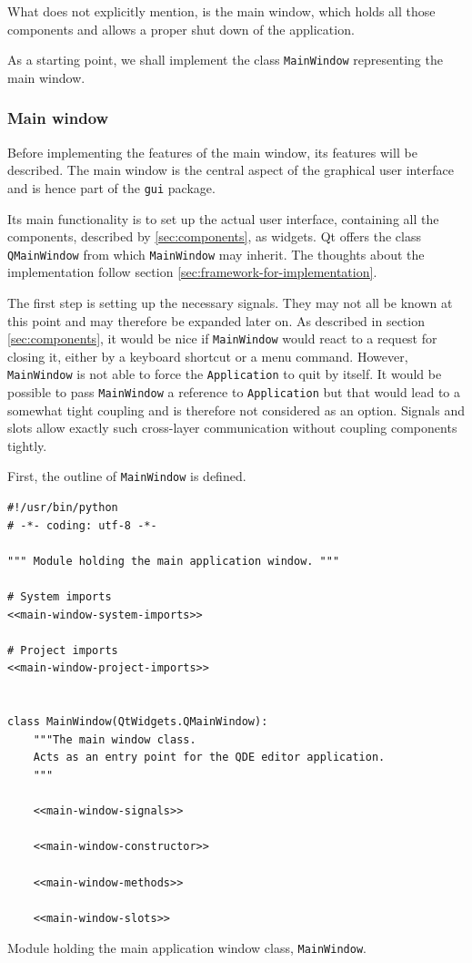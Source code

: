 \documentclass[10pt, openright, notitlepage]{scrreprt}
\begin{document}
What \cite{osterwalder_qde_2016} does not explicitly mention, is the main
window, which holds all those components and allows a proper shut down of the
application.

As a starting point, we shall implement the class \texttt{MainWindow} representing the
main window.

\subsubsection{Main window}
\label{sec:org1632560}

Before implementing the features of the main window, its features will be
described. The main window is the central aspect of the graphical user interface
and is hence part of the \texttt{gui} package.

Its main functionality is to set up the actual user interface, containing all
the components, described by \ref{sec:components}, as widgets. Qt offers the class
\texttt{QMainWindow} from which \texttt{MainWindow} may inherit. The thoughts about the
implementation follow section \ref{sec:framework-for-implementation}.

The first step is setting up the necessary signals. They may not all be known at
this point and may therefore be expanded later on. As described in section
\ref{sec:components}, it would be nice if \texttt{MainWindow} would react to a request for
closing it, either by a keyboard shortcut or a menu command. However,
\texttt{MainWindow} is not able to force the \texttt{Application} to quit by itself. It would
be possible to pass \texttt{MainWindow} a reference to \texttt{Application} but that would
lead to a somewhat tight coupling and is therefore not considered as an option.
Signals and slots allow exactly such cross-layer communication without coupling
components tightly.

First, the outline of \texttt{MainWindow} is defined.

\begin{listing}[H]
\begin{verbatim}
#!/usr/bin/python
# -*- coding: utf-8 -*-

""" Module holding the main application window. """

# System imports
<<main-window-system-imports>>

# Project imports
<<main-window-project-imports>>


class MainWindow(QtWidgets.QMainWindow):
    """The main window class.
    Acts as an entry point for the QDE editor application.
    """

    <<main-window-signals>>

    <<main-window-constructor>>

    <<main-window-methods>>

    <<main-window-slots>>
\end{verbatim}
\caption{Module holding the main application window class, \texttt{MainWindow}.}
\end{listing}
\end{document}
